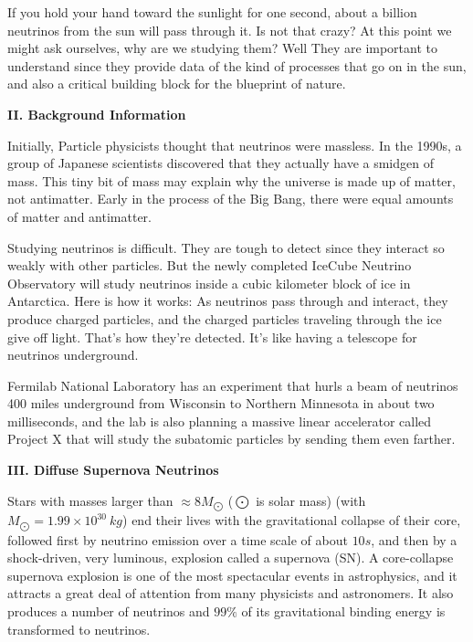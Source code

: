 \documentclass[fleqn]{article}
\begin{document}
  If you hold your hand toward the sunlight for one second, about a billion neutrinos from the sun will pass through it. Is not that crazy? 
  At this point we might ask ourselves, why are we studying them? Well They are important to understand since they provide data of the kind 
  of processes that go on in the sun, and also a critical building block for the blueprint of nature.

  \vspace{20px}

  \textbf{II. Background Information}

  \vspace{10px}

  Initially, Particle physicists thought that neutrinos were massless. In the 1990s, a group of Japanese scientists discovered that they 
  actually have a smidgen of mass. This tiny bit of mass may explain why the universe is made up of matter, not antimatter. Early in the 
  process of the Big Bang, there were equal amounts of matter and antimatter. \textcite{Two}

  Studying neutrinos is difficult. They are tough to detect since they interact so weakly with other particles. But the newly completed 
  IceCube Neutrino Observatory will study neutrinos inside a cubic kilometer block of ice in Antarctica. Here is how it works: 
  As neutrinos pass through and interact, they produce charged particles, and the charged particles traveling through the ice give off light.
  That’s how they’re detected. It’s like having a telescope for neutrinos underground.

  Fermilab National Laboratory has an experiment that hurls a beam of neutrinos 400 miles underground from Wisconsin to Northern Minnesota 
  in about two milliseconds, and the lab is also planning a massive linear accelerator called Project X that will study the subatomic 
  particles by sending them even farther.

  \vspace{20px}

  \textbf{III. Diffuse Supernova Neutrinos}

  \vspace{10px}

  Stars with masses larger than $\approx 8M_{\bigodot}$ ($\bigodot$ is solar mass) (with $M_{\bigodot}=1.99 \times 10^{30} ~ kg$)
  end their lives with the gravitational collapse of their core, followed first by neutrino emission over a time scale of about 
  $10 s$, and then by a shock-driven, very luminous, explosion called a supernova (SN).  
  A core-collapse supernova explosion is one of the most spectacular events in astrophysics,
  and it attracts a great deal of attention from many physicists and astronomers. It
  also produces a number of neutrinos and $99\%$ of its gravitational binding energy is
  transformed to neutrinos.
\end{document}
